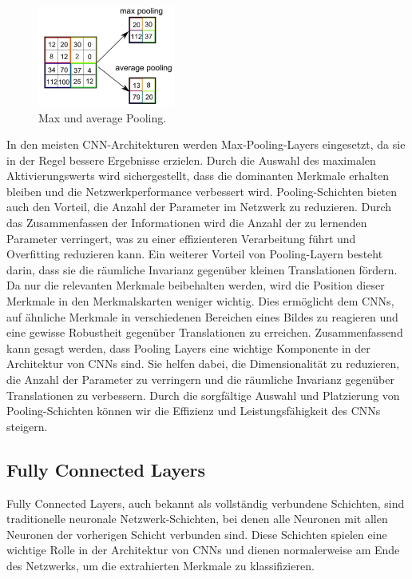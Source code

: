         \begin{figure}[h]
            \centering
            \includegraphics[width=0.4\textwidth]{img/cnn_pooling.png}
            \caption{Max und average Pooling.}
            \label{fig:cnn_kernel_sobel_2}
        \end{figure}
    
    In den meisten \ac{CNN}-Architekturen werden Max-Pooling-Layers eingesetzt, da sie in der Regel bessere Ergebnisse erzielen. 
    Durch die Auswahl des maximalen Aktivierungswerts wird sichergestellt, dass die dominanten Merkmale erhalten bleiben und die Netzwerkperformance verbessert wird.
    Pooling-Schichten bieten auch den Vorteil, die Anzahl der Parameter im Netzwerk zu reduzieren. 
    Durch das Zusammenfassen der Informationen wird die Anzahl der zu lernenden Parameter verringert, was zu einer effizienteren Verarbeitung führt und Overfitting reduzieren kann.
    Ein weiterer Vorteil von Pooling-Layern besteht darin, dass sie die räumliche Invarianz gegenüber kleinen Translationen fördern. Da nur die relevanten Merkmale beibehalten werden, wird die Position dieser Merkmale in den Merkmalskarten weniger wichtig. 
    Dies ermöglicht dem \acp{CNN}, auf ähnliche Merkmale in verschiedenen Bereichen eines Bildes zu reagieren und eine gewisse Robustheit gegenüber Translationen zu erreichen.
    Zusammenfassend kann gesagt werden, dass Pooling Layers eine wichtige Komponente in der Architektur von CNNs sind. 
    Sie helfen dabei, die Dimensionalität zu reduzieren, die Anzahl der Parameter zu verringern und die räumliche Invarianz gegenüber Translationen zu verbessern. 
    Durch die sorgfältige Auswahl und Platzierung von Pooling-Schichten können wir die Effizienz und Leistungsfähigkeit des CNNs steigern.

\subsection{Fully Connected Layers}

    Fully Connected Layers, auch bekannt als vollständig verbundene Schichten, sind traditionelle neuronale Netzwerk-Schichten, bei denen alle Neuronen mit allen Neuronen der vorherigen Schicht verbunden sind.
    Diese Schichten spielen eine wichtige Rolle in der Architektur von \acfp{CNN} und dienen normalerweise am Ende des Netzwerks, um die extrahierten Merkmale zu klassifizieren.   

